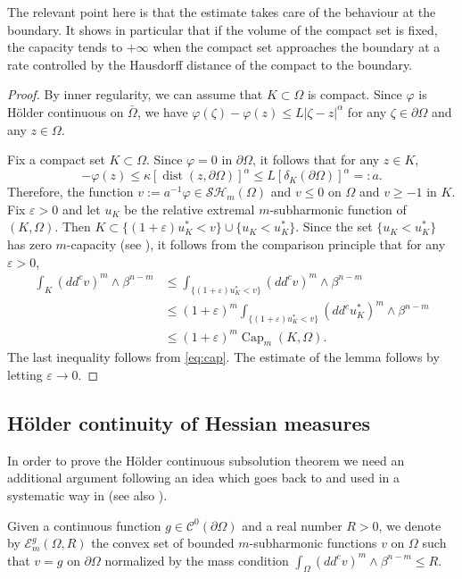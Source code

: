 \documentclass[11pt]{article}
\numberwithin{equation}{section}
\DeclareMathOperator{\dist}{dist}
\theoremstyle{definition}
\newcommand{\Cc}{\mathcal{C}}
\DeclareMathOperator{\Capa}{Cap}
\theoremstyle{plain}
\theoremstyle{definition}
\begin{document}
The relevant point here is that the estimate takes care of the behaviour at the boundary. It shows in particular that if the volume of the compact set is fixed, the capacity tends to $+ \infty$ when the compact set approaches the boundary at a rate controlled by the Hausdorff distance of the compact to the boundary.
\begin{proof}
By inner regularity, we can assume that $K \subset \Omega$ is compact.
Since $\varphi$ is Hölder continuous on $\bar \Omega$, we have
$\varphi (\zeta) - \varphi (z) \leq L \vert \zeta - z\vert^{\alpha}$ for any $\zeta \in \partial \Omega$ and any $z \in \Omega$.

Fix a compact set $K \subset \Omega$. Since $\varphi = 0$ in $\partial \Omega$, it follows that for any $z \in K$,
\[
- \varphi (z) \leq \kappa \left[\dist (z,\partial \Omega)\right]^{\alpha} \leq L \left[\delta_K (\partial \Omega)\right]^{\alpha} =:a.
\]
Therefore, the function $v:= a^{-1} \varphi \in \mathcal{SH}_m (\Omega)$ and $ v \leq 0$ on $\Omega$ and $v \geq - 1$ in $K$. Fix $\varepsilon >0$ and let $u_K$ be the relative extremal $m$-subharmonic function of $(K,\Omega)$. Then $ K \subset \{ (1 + \varepsilon) u_K^* < v\} \cup \{u_K < u_K^*\}$. Since the set $\{u_K < u_K^*\}$ has zero $m$-capacity (see \cite{Lu12}), it follows from the comparison principle that for any $\varepsilon > 0$,
\begin{align*}
\int_K (dd^c v)^m \wedge \beta^{n - m} &\leq \int_{\{ (1 + \varepsilon) u_K^* < v\}} (dd^c v)^m \wedge \beta^{n - m} \\
&\leq (1+ \varepsilon)^m \int_{\{ (1 + \varepsilon) u_K^* < v\}} (dd^c u_K^*)^m \wedge \beta^{n - m} \\
& \leq (1+ \varepsilon)^m \Capa_m (K,\Omega).
\end{align*}
The last inequality follows from \eqref{eq:cap}.
The estimate of the lemma follows by letting $\varepsilon \to 0$.
\end{proof}

\subsection{Hölder continuity of Hessian measures}

In order to prove the Hölder continuous subsolution theorem we need an additional argument following an idea which goes back to \cite{DDGKPZ15} and used in a systematic way in \cite{N18a} (see also \cite{KN19}).

Given a continuous function $g \in \Cc^0 (\partial \Omega)$ and a real number $R > 0$, we denote by $\mathcal{E}^g_m(\Omega,R)$ the convex set of bounded $m$-subharmonic functions $v $ on $\Omega$ such that $v = g$ on $\partial \Omega$ normalized by the mass condition $\int_{\Omega} (dd^c v)^m \wedge \beta^{n -m} \leq R$.
\end{document}
